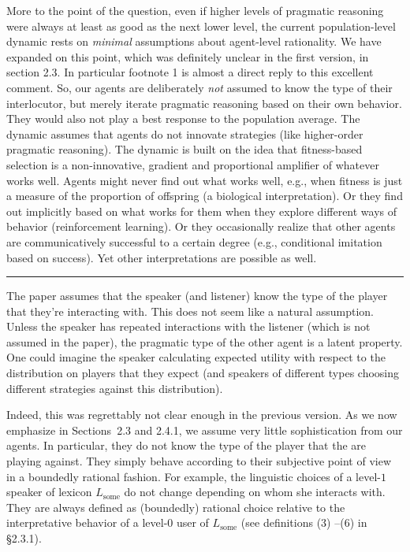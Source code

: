 \documentclass[12pt,a4paper]{article}
\begin{document}
More to the point of the question, even if higher levels of pragmatic reasoning were always at least as good as the next lower level, the current population-level dynamic rests on \emph{minimal} assumptions about agent-level rationality. We have expanded on this point, which was definitely unclear in the first version, in section 2.3. In particular footnote 1 is almost a direct reply to this excellent comment. So, our agents are deliberately \emph{not} assumed to know the type of their interlocutor, but merely iterate pragmatic reasoning based on their own behavior. They would also not play a best response to the population average. The dynamic assumes that agents do not innovate strategies (like higher-order pragmatic reasoning). The dynamic is built on the idea that fitness-based selection is a non-innovative, gradient and proportional amplifier of whatever works well. Agents might never find out what works well, e.g., when fitness is just a measure of the proportion of offspring (a biological interpretation). Or they find out implicitly based on what works for them when they explore different ways of behavior (reinforcement learning). Or they occasionally realize that other agents are communicatively successful to a certain degree (e.g., conditional imitation based on success). Yet other interpretations are possible as well. 


%
\vspace{0.5cm}

\noindent\rule{\textwidth}{1pt}

\begin{mdframed}[backgroundcolor=gray!25,linecolor=gray!25,frametitle= Reviewer \thereviewerCounter~comment \thereviewerCommentCounter \hfill ~~({\it agent simplicity})]
%
The paper assumes that the speaker (and listener) know the type of the player that they're interacting with. This does not seem like a natural assumption. Unless the speaker has repeated interactions with the listener (which is not assumed in the paper), the pragmatic type of the other agent is a latent property. One could imagine the speaker calculating expected utility with respect to the distribution on players that they expect (and speakers of different types choosing different strategies against this distribution). 

%
\end{mdframed}

Indeed, this was regrettably not clear enough in the previous version. As we now emphasize in Sections~2.3 and 2.4.1, we assume very little sophistication from our agents. In particular, they do not know the type of the player that the are playing against. They simply behave according to their subjective point of view in a boundedly rational fashion. For example, the linguistic choices of a level-$1$ speaker of lexicon $L_{\text{some}}$ do not change depending on whom she interacts with. They are always defined as (boundedly) rational choice relative to the interpretative behavior of a level-$0$ user of $L_{\text{some}}$ (see definitions (3) --(6) in \S2.3.1).
%
\end{document}
